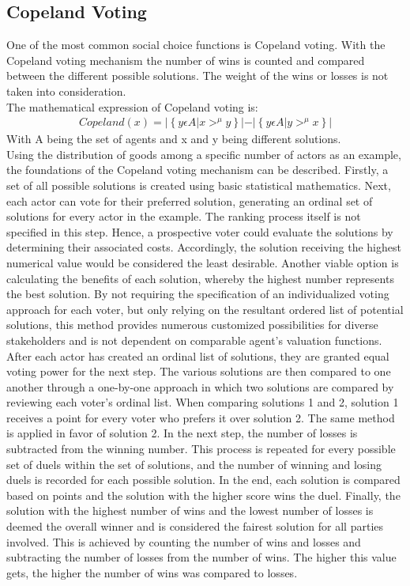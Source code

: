 \documentclass[german, a4paper, 11pt, oneside]{scrbook}
\begin{document}
\subsection{Copeland Voting}
One of the most common social choice functions is Copeland voting. With the Copeland voting mechanism the number of wins is counted and compared between the different possible solutions. The weight of the wins or losses is not taken into consideration. \cite{ALEXANDERJOHANPHILIPPEEK.2022,FelixBrandtVincentConitzerUlleEndrissJeromeLangandArielD.Procaccia.}
\\The mathematical expression of Copeland voting is:
\begin{align}
Copeland(x) = \left| \left\{ y \epsilon A \left| x>^\mu y \right\} \left| - \right| \left\{ y \epsilon A   \right| y>^\mu x   \right\} \right|
\end{align}
With A being the set of agents and x and y being different solutions.
\\Using the distribution of goods among a specific number of actors as an example, the foundations of the Copeland voting mechanism can be described.  Firstly, a set of all possible solutions is created using basic statistical mathematics. Next, each actor can vote for their preferred solution, generating an ordinal set of solutions for every actor in the example. The ranking process itself is not specified in this step. Hence, a prospective voter could evaluate the solutions by determining their associated costs. Accordingly, the solution receiving the highest numerical value would be considered the least desirable. Another viable option is calculating the benefits of each solution, whereby the highest number represents the best solution. By not requiring the specification of an individualized voting approach for each voter, but only relying on the resultant ordered list of potential solutions, this method provides numerous customized possibilities for diverse stakeholders and is not dependent on comparable agent's valuation functions. After each actor has created an ordinal list of solutions, they are granted equal voting power for the next step. The various solutions are then compared to one another through a one-by-one approach in which two solutions are compared by reviewing each voter's ordinal list. \cite{Bhavnani.2022b} When comparing solutions 1 and 2, solution 1 receives a point for every voter who prefers it over solution 2. The same method is applied in favor of solution 2. In the next step, the number of losses is subtracted from the winning number. This process is repeated for every possible set of duels within the set of solutions, and the number of winning and losing duels is recorded for each possible solution.  In the end, each solution is compared based on points and the solution with the higher score wins the duel. Finally, the solution with the highest number of wins and the lowest number of losses is deemed the overall winner and is considered the fairest solution for all parties involved. This is achieved by counting the number of wins and losses and subtracting the number of losses from the number of wins. The higher this value gets, the higher the number of wins was compared to losses. \cite{Bhavnani.2022b,ALEXANDERJOHANPHILIPPEEK.2022,FelixBrandtVincentConitzerUlleEndrissJeromeLangandArielD.Procaccia.}
\end{document}
